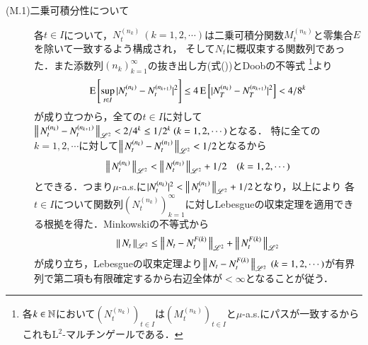 \begin{description}
\begin{description}
				\item[(M.1)二乗可積分性について]
					各$t \in I$について，$N^{(n_k)}_t\ (k=1,2,\cdots)$は二乗可積分関数$M^{(n_k)}_t$と零集合$E$を除いて一致するよう構成され，
					そして$N_t$に概収束する関数列であった．また添数列$(n_k)_{k=1}^{\infty}$の抜き出し方(式())とDoobの不等式
					\footnote{各$k \in \mathbb{N}$において$(N^{(n_k)}_t)_{t \in I}$は$(M^{(n_k)}_t)_{t \in I}$と$\mu$-a.s.にパスが一致するからこれも$\mathrm{L}^2$-マルチンゲールである．}より
					\begin{align}
						\operatorname{E} \left[ \operatorname*{sup}_{t \in I} |N^{(n_k)}_t - N^{(n_{k+1})}_t|^2 \right] \leq 4 \operatorname{E} \left[ |N^{(n_k)}_T - N^{(n_{k+1})}_T|^2 \right] < 4/8^k
					\end{align}
					が成り立つから，全ての$t \in I$に対して$\left\|\, N^{(n_k)}_t - N^{(n_{k+1})}_t\, \right\|_{\mathscr{L}^2} < 2/4^k \leq 1/2^k \ (k=1,2,\cdots)$となる．
					特に全ての$k = 1,2,\cdots$に対して$\left\|\, N^{(n_k)}_t - N^{(n_1)}_t\, \right\|_{\mathscr{L}^2} < 1/2$となるから
					\begin{align}
						\left\|\, N^{(n_k)}_t\, \right\|_{\mathscr{L}^2} < \left\|\, N^{(n_1)}_t\, \right\|_{\mathscr{L}^2} + 1/2 \quad (k = 1,2,\cdots)
					\end{align}
					とできる．つまり$\mu$-a.s.に$|N^{(n_k)}_t|^2 < \left\|\, N^{(n_1)}_t\, \right\|_{\mathscr{L}^2} + 1/2$となり，以上により
					各$t \in I$について関数列$(N^{(n_k)}_t)_{k=1}^{\infty}$に対しLebesgueの収束定理を適用できる根拠を得た．Minkowskiの不等式から
					\begin{align}
						\left\|\, N_t\, \right\|_{\mathscr{L}^2} \leq \left\|\, N_t - N^{F(k)}_t\, \right\|_{\mathscr{L}^2} + \left\|\, N^{F(k)}_t\, \right\|_{\mathscr{L}^2}
					\end{align}
					が成り立ち，Lebesgueの収束定理より$\Norm{N_t - N^{F(k)}_t}{\mathscr{L}^2}\ (k=1,2,\cdots)$が有界列で第二項も有限確定するから右辺全体が$< \infty$となることが従う．
				

\end{description}
\end{description}
